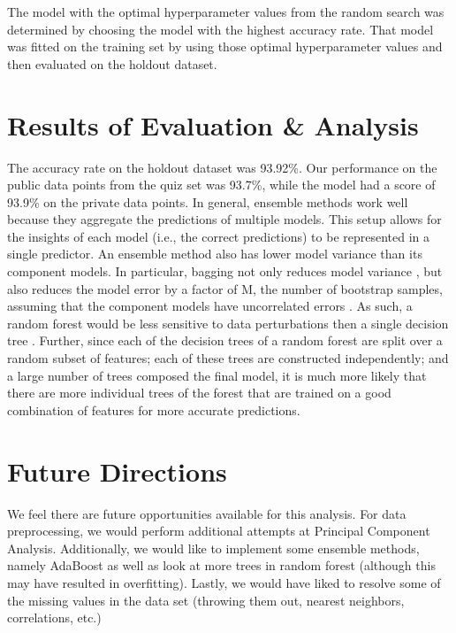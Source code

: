 \documentclass[twoside,11pt]{article}
\begin{document}
The model with the optimal hyperparameter values from the random search was determined by choosing the model with the highest accuracy rate.  That model was fitted on the training set by using those optimal hyperparameter values and then evaluated on the holdout dataset.

\section{Results of Evaluation \& Analysis}
The accuracy rate on the holdout dataset was  93.92\%. Our performance on the public data points from the quiz set was 93.7\%, while the model had a score of 93.9\% on the private data points. In general, ensemble methods work well because they aggregate the predictions of multiple models. This setup allows for the insights of each model (i.e., the correct predictions) to be represented in a single predictor. An ensemble method also has lower model variance than its component models. In particular, bagging not only reduces model variance \citep[chap.~11]{hal06}, but also reduces the model error by a factor of M, the number of bootstrap samples, assuming that the component models have uncorrelated errors \citep[chap.~14]{chris06}. As such, a random forest would be less sensitive to data perturbations then a single decision tree \citep[chap.~11]{hal06}. Further, since each of the decision trees of a random forest are split over a random subset of features; each of these trees are constructed independently; and a large number of trees composed the final model, it is much more likely that there are more individual trees of the forest that are trained on a good combination of features for more accurate predictions.

\section{Future Directions}
We feel there are future opportunities available for this analysis. For data preprocessing, we would perform additional attempts at Principal Component Analysis.  Additionally, we would like to implement some ensemble methods, namely AdaBoost as well as look at more trees in random forest (although this may have resulted in overfitting).  Lastly, we would have liked to resolve some of the missing values in the data set (throwing them out, nearest neighbors, correlations, etc.)

\end{document}
